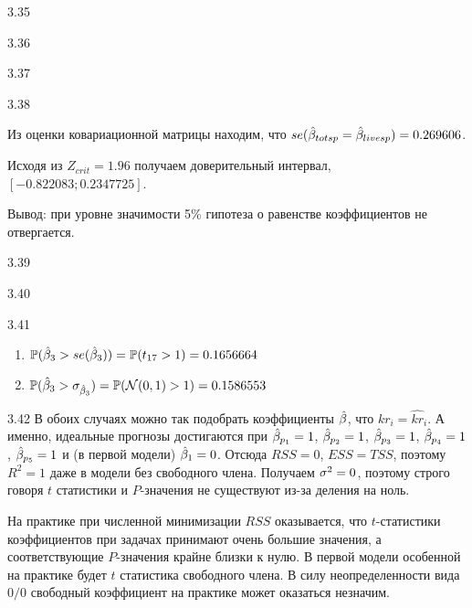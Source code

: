 \protect \hypertarget {soln:3.35}{}
\begin{solution}{{3.35}}
\end{solution}
\protect \hypertarget {soln:3.36}{}
\begin{solution}{{3.36}}
\end{solution}
\protect \hypertarget {soln:3.37}{}
\begin{solution}{{3.37}}
\end{solution}
\protect \hypertarget {soln:3.38}{}
\begin{solution}{{3.38}}



Из оценки ковариационной матрицы находим, что $se(\hat{\beta}_{totsp}=\hat{\beta}_{livesp})=
0.269606
$.

Исходя из $Z_{crit}=1.96$ получаем доверительный интервал, $[
-0.822083
;
0.2347725
]$.

Вывод: при уровне значимости 5\% гипотеза о равенстве коэффициентов не отвергается.
\end{solution}
\protect \hypertarget {soln:3.39}{}
\begin{solution}{{3.39}}
\end{solution}
\protect \hypertarget {soln:3.40}{}
\begin{solution}{{3.40}}
\end{solution}
\protect \hypertarget {soln:3.41}{}
\begin{solution}{{3.41}}

\begin{enumerate}
\item $\mathbb{P}(\hat{\beta}_3>se(\hat{\beta}_3))=\mathbb{P}(t_{17}>1)=
0.1656664
$
\item $\mathbb{P}(\hat{\beta}_3>\sigma_{\hat{\beta}_3})=\mathbb{P}(\mathcal{N}(0,1)>1)=
0.1586553
$
\end{enumerate}
\end{solution}
\protect \hypertarget {soln:3.42}{}
\begin{solution}{{3.42}}
В обоих случаях можно так подобрать коэффициенты $\hat{\beta}$, что $kr_i=\widehat{kr}_i$. А именно, идеальные прогнозы достигаются при  $\hat{\beta}_{p_1}=1$, $\hat{\beta}_{p_2}=1$, $\hat{\beta}_{p_3}=1$, $\hat{\beta}_{p_4}=1$, $\hat{\beta}_{p_5}=1$ и (в первой модели) $\hat{\beta}_1=0$. Отсюда $RSS=0$, $ESS=TSS$, поэтому $R^2=1$ даже в модели без свободного члена. Получаем $\sigma^2=0$, поэтому строго говоря $t$ статистики и $P$-значения не существуют из-за деления на ноль.

На практике при численной минимизации $RSS$ оказывается, что $t$-статистики коэффициентов при задачах принимают очень большие значения, а соответствующие $P$-значения крайне близки к нулю. В первой модели особенной на практике будет $t$ статистика свободного члена. В силу неопределенности вида $0/0$ свободный коэффициент на практике может оказаться незначим.
\end{solution}
